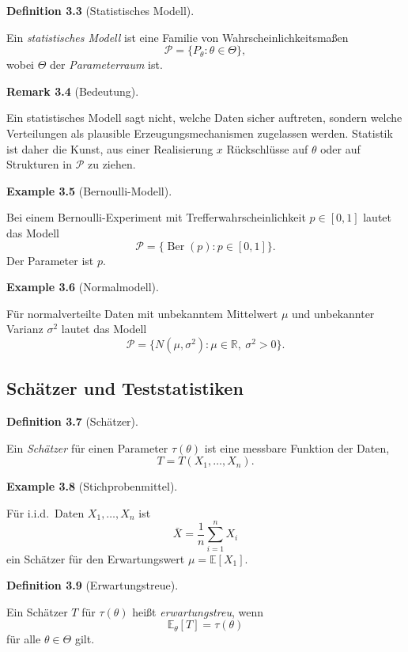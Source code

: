 \documentclass[10pt, letterpaper]{article}
\newcommand{\R}{\mathbb{R}}
\newcommand{\CustomHeading}[3]{%
  \par\medskip\noindent%
  \textbf{#1 #2} \textnormal{(#3)}.\enskip%
}
\newenvironment{DEF}[2]{\CustomHeading{Definition}{#1}{#2}}{}
\newenvironment{REM}[2]{\CustomHeading{Remark}{#1}{#2}}{}
\newenvironment{EXA}[2]{\CustomHeading{Example}{#1}{#2}}{}
\begin{document}
\begin{DEF}{3.3}{Statistisches Modell}
Ein \emph{statistisches Modell} ist eine Familie von Wahrscheinlichkeitsmaßen
\[
\mathcal P=\{P_\theta:\theta\in\Theta\},
\]
wobei \(\Theta\) der \emph{Parameterraum} ist.
\end{DEF}

\begin{REM}{3.4}{Bedeutung}
Ein statistisches Modell sagt nicht, welche Daten sicher auftreten, sondern welche Verteilungen als plausible Erzeugungsmechanismen zugelassen werden. Statistik ist daher die Kunst, aus einer Realisierung \(x\) Rückschlüsse auf \(\theta\) oder auf Strukturen in \(\mathcal P\) zu ziehen.
\end{REM}

\begin{EXA}{3.5}{Bernoulli-Modell}
Bei einem Bernoulli-Experiment mit Trefferwahrscheinlichkeit \(p\in[0,1]\) lautet das Modell
\[
\mathcal P=\{\operatorname{Ber}(p):p\in[0,1]\}.
\]
Der Parameter ist \(p\).
\end{EXA}

\begin{EXA}{3.6}{Normalmodell}
Für normalverteilte Daten mit unbekanntem Mittelwert \(\mu\) und unbekannter Varianz \(\sigma^2\) lautet das Modell
\[
\mathcal P=\{N(\mu,\sigma^2):\mu\in\R,\ \sigma^2>0\}.
\]
\end{EXA}

\subsection{Schätzer und Teststatistiken}

\begin{DEF}{3.7}{Schätzer}
Ein \emph{Schätzer} für einen Parameter \(\tau(\theta)\) ist eine messbare Funktion der Daten,
\[
T=T(X_1,\dots,X_n).
\]
\end{DEF}

\begin{EXA}{3.8}{Stichprobenmittel}
Für i.i.d.\ Daten \(X_1,\dots,X_n\) ist
\[
\bar X=\frac1n\sum_{i=1}^n X_i
\]
ein Schätzer für den Erwartungswert \(\mu=\mathbb E[X_1]\).
\end{EXA}

\begin{DEF}{3.9}{Erwartungstreue}
Ein Schätzer \(T\) für \(\tau(\theta)\) heißt \emph{erwartungstreu}, wenn
\[
\mathbb E_\theta[T]=\tau(\theta)
\]
für alle \(\theta\in\Theta\) gilt.
\end{DEF}
\end{document}
